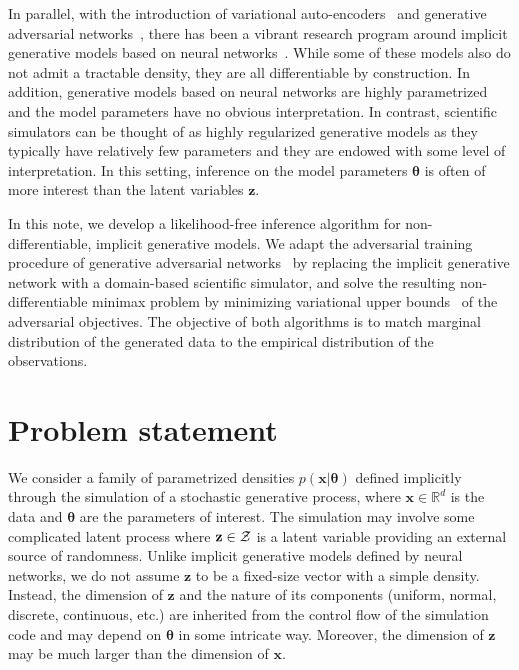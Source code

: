 \documentclass[twocolumn,superscriptaddress,aps]{revtex4-1}
\newcommand{\bftheta}{{\bm \theta}}
\newcommand{\bfx}{\mathbf{x}}
\newcommand{\bfz}{\mathbf{z}}
\theoremstyle{plain}
\begin{document}
In parallel, with the introduction of variational
auto-encoders~\citep{DBLP:journals/corr/KingmaW13} and generative adversarial
networks~\cite{goodfellow2014generative}, there has been a vibrant research
program around implicit generative models based on neural
networks~\citep{2016arXiv161003483M}.  While some of these models
also do not admit a tractable density, they are all differentiable by construction.
In addition, generative models based on neural networks are highly parametrized and the model
parameters have no obvious interpretation. In contrast, scientific simulators
can be thought of as highly regularized generative models as they typically have
relatively few parameters and they are endowed with some level of
interpretation. In this setting, inference on the model parameters $\bftheta$ is
often of more interest than the latent variables $\bfz$.

In this note, we develop a likelihood-free inference algorithm
for non-differentiable, implicit generative models.
We adapt the adversarial
training procedure of generative adversarial
networks~\cite{goodfellow2014generative} by replacing the implicit generative
network with a domain-based scientific simulator, and solve the resulting
non-differentiable minimax problem by minimizing variational upper
bounds~\citep{2011arXiv1106.4487W,2012arXiv1212.4507S} of the adversarial
objectives.
The objective of both algorithms is to match marginal distribution of
the generated data to the empirical distribution of the observations.



\section{Problem statement}
\label{sec:problem}

We consider a family of parametrized densities $p(\mathbf{x}|\bftheta)$
defined implicitly through the simulation of a stochastic generative process,
where $\mathbf{x} \in \mathbb{R}^d$ is the data and $\bftheta$ are the
parameters of interest. The simulation may involve some complicated latent
process
where $\bfz \in {\cal Z}$ is a latent variable providing an external
source of randomness.
Unlike implicit generative models defined by neural networks, we do not assume
$\bfz$ to be a fixed-size vector with a simple density. Instead, the
dimension of $\bfz$ and the nature of its components (uniform, normal,
discrete, continuous, etc.) are inherited from the control flow of the
simulation code and may depend on $\bftheta$ in some intricate way. Moreover,
the dimension of $\bfz$ may be much larger than the dimension of
$\bfx$.
\end{document}
